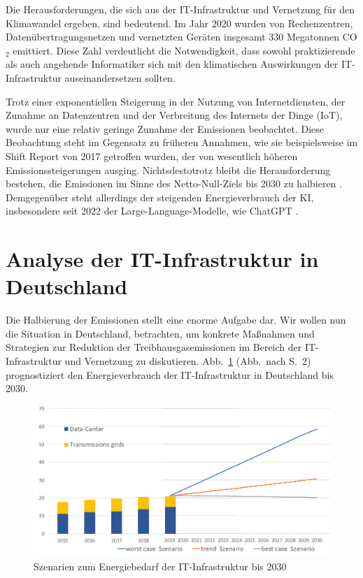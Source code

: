 \documentclass{article}
\begin{document}
Die Herausforderungen, die sich aus der IT-Infrastruktur und Vernetzung für den Klimawandel ergeben, sind bedeutend. Im Jahr 2020 wurden von Rechenzentren, Datenübertragungsnetzen und vernetzten Geräten insgesamt 330 Megatonnen CO$_2$ emittiert. Diese Zahl verdeutlicht die Notwendigkeit, dass sowohl praktizierende als auch angehende Informatiker sich mit den klimatischen Auswirkungen der IT-Infrastruktur auseinandersetzen sollten.

Trotz einer exponentiellen Steigerung in der Nutzung von Internetdiensten, der Zunahme an Datenzentren und der Verbreitung des Internets der Dinge (IoT), wurde nur eine relativ geringe Zunahme der Emissionen beobachtet. Diese Beobachtung steht im Gegensatz zu früheren Annahmen, wie sie beispielsweise im Shift Report von 2017 getroffen wurden, der von wesentlich höheren Emissionssteigerungen ausging. Nichtsdestotrotz bleibt die Herausforderung bestehen, die Emissionen im Sinne des Netto-Null-Ziels bis 2030 zu halbieren \cite{iea_net_zero2023}.
Demgegenüber steht allerdings der steigenden Energieverbrauch der KI, insbesondere seit 2022 der Large-Language-Modelle, wie ChatGPT \cite{noauthor_ai_nodate}.

\section{Analyse der IT-Infrastruktur in Deutschland}
Die Halbierung der Emissionen stellt eine enorme Aufgabe dar. Wir wollen nun die Situation in Deutschland, betrachten, um konkrete Maßnahmen und Strategien zur Reduktion der Treibhausgasemissionen im Bereich der IT-Infrastruktur und Vernetzung zu diskutieren.
Abb.~\ref{fig:TAB2022_energy demand of ICT} (Abb.~nach \cite{grunwald_energy_2022} S.~2) prognostiziert den Energieverbrauch der IT-Infrastruktur in Deutschland bis 2030.

\begin{figure}[h]
	\centering
		\includegraphics[width=1.00\textwidth]{../Figures/fignachTAB22.png}
		\caption{Szenarien zum Energiebedarf der IT-Infrastruktur bis 2030}
	\label{fig:TAB2022_energy demand of ICT}
\end{figure}
\end{document}
